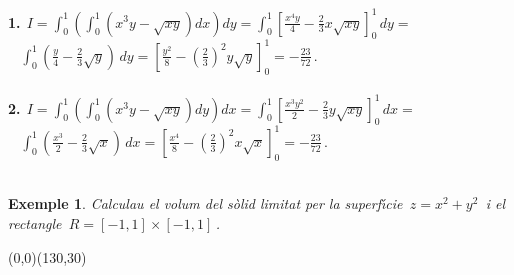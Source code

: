 \documentclass[12pt]{article}
\newtheorem{exemple}{Exemple}[subsection]
\begin{document}
\hspace*{1cm}\textbf{1.}$\displaystyle\ \
I=\int_0^1\left(\int_0^1(x^3 y -\sqrt{x y})dx\right)dy=
\int_0^1\left[\frac{x^4 y}{4} -\frac{2}{3}x\sqrt{x
y}\right]_0^1\,dy=$\\

\hspace*{1cm}$\displaystyle\ \ \ \ \int_0^1(\frac{y}{4}
-\frac{2}{3}\sqrt{ y})\,dy=\left[\frac{y^2}{8}
-\left(\frac{2}{3}\right)^2 y\sqrt{
y}\right]_0^1=-\frac{23}{72}\,.$\\ \\

\hspace*{1cm}\textbf{2.}$\displaystyle\ \
I=\int_0^1\left(\int_0^1(x^3 y -\sqrt{x y})dy\right)dx=
\int_0^1\left[\frac{x^3 y^2}{2} -\frac{2}{3}y\sqrt{x
y}\right]_0^1\,dx=$\\

\hspace*{1cm}$\displaystyle\ \ \ \ \int_0^1(\frac{x^3}{2}
-\frac{2}{3}\sqrt{x})\,dx=\left[\frac{x^4}{8}
-\left(\frac{2}{3}\right)^2 x\sqrt{
x}\right]_0^1=-\frac{23}{72}\,.$\\\\

\begin{exemple}
Calculau el volum del s{\`o}lid limitat per la superf{\'\i}cie $\,z=x^2+y^2\,
$ i el rectangle $\, R=[-1,1]\times[-1,1]\, $.
\end{exemple}

\vspace*{5cm}
\begin{center}
\begin{picture}(0,0)(130,30)
\end{picture}
\end{center}
\end{document}
